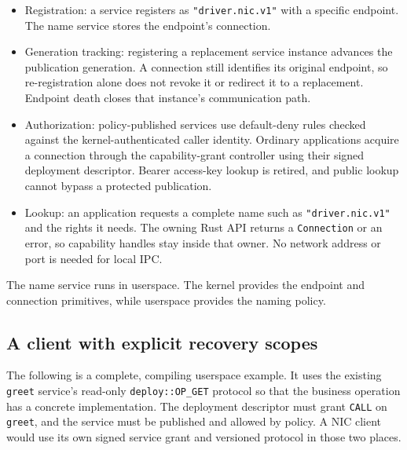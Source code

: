 \begin{itemize}
    \item Registration: a service registers as \texttt{"driver.nic.v1"}
        with a specific endpoint. The name service stores the endpoint's
        connection.
    \item Generation tracking: registering a replacement service instance
        advances the publication generation. A connection still identifies its
        original endpoint, so re-registration alone does not revoke it or
        redirect it to a replacement.
        Endpoint death closes that instance's communication path.
    \item Authorization: policy-published services use default-deny rules
        checked against the kernel-authenticated caller identity. Ordinary
        applications acquire a connection through the capability-grant controller
        using their signed deployment descriptor. Bearer access-key lookup is
        retired, and public lookup cannot bypass a protected publication.
    \item Lookup: an application requests a complete name such as
        \texttt{"driver.nic.v1"} and the rights it needs. The owning Rust API
        returns a \texttt{Connection} or an error, so capability handles stay
        inside that owner. No network address or port is needed for local IPC.
\end{itemize}

The name service runs in userspace. The kernel provides the endpoint and
connection primitives, while userspace provides the naming policy.

\subsection{A client with explicit recovery scopes}
\label{sec:reconnecting-client}

The following is a complete, compiling userspace example. It uses the existing
\texttt{greet} service's read-only \texttt{deploy::OP\_GET} protocol so that the
business operation has a concrete implementation. The deployment descriptor
must grant \texttt{CALL} on \texttt{greet}, and the service must be published and
allowed by policy. A NIC client would use its own signed service grant and
versioned protocol in those two places.

